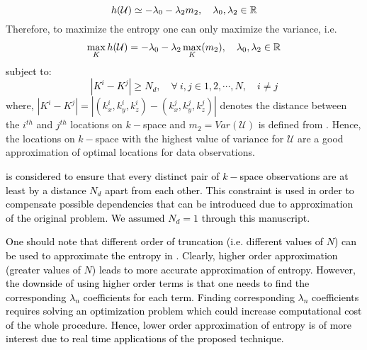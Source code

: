 \documentclass{article}         %
\theoremstyle{definition}
\theoremstyle{remark}
\begin{document}
\begin{equation}\label{entropy_var}
h(\mathcal{U})\simeq -\lambda_0-\lambda_2 m_2,\quad \lambda_0,\lambda_2 \in \mathbb R
\end{equation}
Therefore, to maximize the entropy one can only maximize the variance, i.e.
\begin{eqnarray}\label{entropy_var_max}
\max_{K} h(\mathcal{U})= -\lambda_0 -\lambda_2 \max_{K}(m_2), \quad \lambda_0,\lambda_2 \in \mathbb R
\end{eqnarray}
\textcolor{black}{subject to:
\begin{equation}\label{sparsity_con}
|K^i-K^j|\geq N_d,\quad \forall\ i,j\in 1,2,\cdots,N,\quad i\neq j 
\end{equation}}
where, $|K^i-K^j|=|(k_x^i,k_y^i,k_z^i)-(k_x^j,k_y^j,k_z^j)|$ denotes the
distance between the $i^{th}$ and $j^{th}$ locations on $k-$space and
$m_2=Var(\mathcal{U})$ is defined from . Hence, the locations on
$k-$space with the highest value of variance for $\mathcal{U}$ are a good
approximation of optimal locations for data observations. 

\textcolor{black}{ is considered to ensure that every distinct
pair of $k-$space observations are at least by a distance $N_d$ apart from each
other. This constraint is used in order to compensate possible dependencies
that can be introduced due to approximation of the original problem. We assumed
$N_d=1$ through this manuscript.}

\textcolor{black}{One should note that different order of truncation (i.e.
different values of $N$) can be used to approximate the entropy in
. Clearly, higher order approximation (greater values of
$N$) leads to more accurate approximation of entropy. However, the downside of
using higher order terms is that one needs to find the corresponding
$\lambda_n$ coefficients for each term. Finding corresponding $\lambda_n$
coefficients requires solving an optimization problem which could increase
computational cost of the whole procedure. Hence, lower order approximation of
entropy is of more interest due to real time applications of the proposed
technique.}
\end{document}
